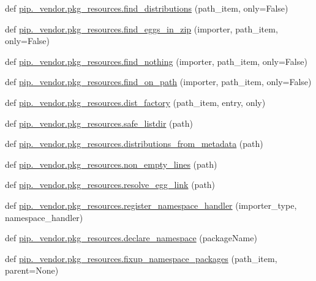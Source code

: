 \begin{DoxyCompactItemize}
\item 
def \hyperlink{namespacepip_1_1__vendor_1_1pkg__resources_a9f1ced181efd53ae61e5cadb9cff8dbe}{pip.\+\_\+vendor.\+pkg\+\_\+resources.\+find\+\_\+distributions} (path\+\_\+item, only=False)
\item 
def \hyperlink{namespacepip_1_1__vendor_1_1pkg__resources_a16265aa2ff58ff32bb6dff99d0459f6e}{pip.\+\_\+vendor.\+pkg\+\_\+resources.\+find\+\_\+eggs\+\_\+in\+\_\+zip} (importer, path\+\_\+item, only=False)
\item 
def \hyperlink{namespacepip_1_1__vendor_1_1pkg__resources_a06361cf701f70db5aeed4a4b121fbb31}{pip.\+\_\+vendor.\+pkg\+\_\+resources.\+find\+\_\+nothing} (importer, path\+\_\+item, only=False)
\item 
def \hyperlink{namespacepip_1_1__vendor_1_1pkg__resources_a8031e03c5da8873c261a7cc9c7dfe665}{pip.\+\_\+vendor.\+pkg\+\_\+resources.\+find\+\_\+on\+\_\+path} (importer, path\+\_\+item, only=False)
\item 
def \hyperlink{namespacepip_1_1__vendor_1_1pkg__resources_a40ecc69f1bfb2ad4d6b126f1ffe89249}{pip.\+\_\+vendor.\+pkg\+\_\+resources.\+dist\+\_\+factory} (path\+\_\+item, entry, only)
\item 
def \hyperlink{namespacepip_1_1__vendor_1_1pkg__resources_a58ffc9484616bc8036f165b155a84a89}{pip.\+\_\+vendor.\+pkg\+\_\+resources.\+safe\+\_\+listdir} (path)
\item 
def \hyperlink{namespacepip_1_1__vendor_1_1pkg__resources_a27b4990c4dcfc81b97cad629ae53ebb1}{pip.\+\_\+vendor.\+pkg\+\_\+resources.\+distributions\+\_\+from\+\_\+metadata} (path)
\item 
def \hyperlink{namespacepip_1_1__vendor_1_1pkg__resources_a29953f63b3b46343345df0e126dd3b1f}{pip.\+\_\+vendor.\+pkg\+\_\+resources.\+non\+\_\+empty\+\_\+lines} (path)
\item 
def \hyperlink{namespacepip_1_1__vendor_1_1pkg__resources_a6788447ac6b0b1b785fe2c7dbd0dd45b}{pip.\+\_\+vendor.\+pkg\+\_\+resources.\+resolve\+\_\+egg\+\_\+link} (path)
\item 
def \hyperlink{namespacepip_1_1__vendor_1_1pkg__resources_aa03be37380c727d1599bfd637181056e}{pip.\+\_\+vendor.\+pkg\+\_\+resources.\+register\+\_\+namespace\+\_\+handler} (importer\+\_\+type, namespace\+\_\+handler)
\item 
def \hyperlink{namespacepip_1_1__vendor_1_1pkg__resources_a49c145737085dcb078a6d33c508f816c}{pip.\+\_\+vendor.\+pkg\+\_\+resources.\+declare\+\_\+namespace} (package\+Name)
\item 
def \hyperlink{namespacepip_1_1__vendor_1_1pkg__resources_a742383e33a0a8dd1ad27c0d0c014a00a}{pip.\+\_\+vendor.\+pkg\+\_\+resources.\+fixup\+\_\+namespace\+\_\+packages} (path\+\_\+item, parent=None)

\end{DoxyCompactItemize}
